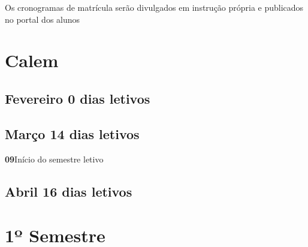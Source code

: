 \documentclass[thesis]{hmcposter}
\begin{document}
\begin{poster}
\begin{center}
\null
\newline
\begin{table}
\centering
{}
\end{table}
\newline
\null
\newline
Os cronogramas de matrícula serão divulgados em instrução própria e publicados no portal dos alunos
\end{center}
\vfill
\null
\newpage\section{\color{hmcorange}Calem}\subsection{Fevereiro \hfill 0 dias letivos}\subsection{Março \hfill 14 dias letivos}\textbf{09}\qquad Início do semestre letivo \newline \null\subsection{Abril \hfill 16 dias letivos}\vfill\null
\columnbreak
\section{\hfill \color{hmcorange}1º Semestre}

\end{poster}
\end{document}
